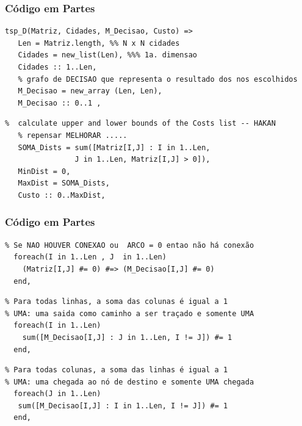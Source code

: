\begin{frame}[fragile] 

\frametitle{Código em Partes}

\begin{footnotesize}
\begin{verbatim}
tsp_D(Matriz, Cidades, M_Decisao, Custo) =>
   Len = Matriz.length, %% N x N cidades
   Cidades = new_list(Len), %%% 1a. dimensao
   Cidades :: 1..Len,
   % grafo de DECISAO que representa o resultado dos nos escolhidos
   M_Decisao = new_array (Len, Len),
   M_Decisao :: 0..1 ,
\end{verbatim}
\end{footnotesize}
\pause

\begin{footnotesize}
\begin{verbatim}
%  calculate upper and lower bounds of the Costs list -- HAKAN
   % repensar MELHORAR .....
   SOMA_Dists = sum([Matriz[I,J] : I in 1..Len, 
                J in 1..Len, Matriz[I,J] > 0]),
   MinDist = 0,
   MaxDist = SOMA_Dists,
   Custo :: 0..MaxDist,
\end{verbatim}
\end{footnotesize}    
    
\end{frame}


\begin{frame}[fragile] 

\frametitle{Código em Partes}

\begin{footnotesize}
\begin{verbatim}
% Se NAO HOUVER CONEXAO ou  ARCO = 0 entao não há conexão
  foreach(I in 1..Len , J  in 1..Len)
    (Matriz[I,J] #= 0) #=> (M_Decisao[I,J] #= 0)
  end,    
\end{verbatim}
\end{footnotesize}
\pause

\begin{footnotesize}
\begin{verbatim}
% Para todas linhas, a soma das colunas é igual a 1
% UMA: uma saida como caminho a ser traçado e somente UMA
  foreach(I in 1..Len)
    sum([M_Decisao[I,J] : J in 1..Len, I != J]) #= 1
  end,     
\end{verbatim}
\end{footnotesize}

\pause

\begin{footnotesize}
\begin{verbatim}
% Para todas colunas, a soma das linhas é igual a 1  
% UMA: uma chegada ao nó de destino e somente UMA chegada
  foreach(J in 1..Len)
   sum([M_Decisao[I,J] : I in 1..Len, I != J]) #= 1
  end,     
\end{verbatim}
\end{footnotesize}    
    
\end{frame}

